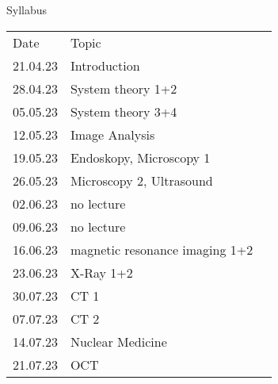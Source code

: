 \begin{frame}[c]{Syllabus}
\begin{table}[]
\begin{tabular}{rll}
\multicolumn{1}{l}{Date} & \multicolumn{1}{l}{Topic}      & \multicolumn{1}{c}{} \\
21.04.23                 & Introduction                   &                      \\
28.04.23                 & System theory 1+2              &                      \\
05.05.23                 & System theory  3+4             &                      \\
12.05.23                 & Image Analysis                 &                      \\
19.05.23                 & Endoskopy, Microscopy 1       &                      \\
26.05.23                 & Microscopy 2, Ultrasound       &                      \\
02.06.23                 & no lecture                &                      \\
09.06.23                 & no lecture                      &                      \\
16.06.23                 & magnetic resonance imaging 1+2       &                      \\
23.06.23                 & X-Ray 1+2  &                      \\
30.07.23                 & CT 1                           &                      \\
07.07.23                 & CT 2                           &                      \\
14.07.23                 & Nuclear Medicine                         &                      \\
21.07.23                 & OCT          &
\end{tabular}
\end{table}
\end{frame}

